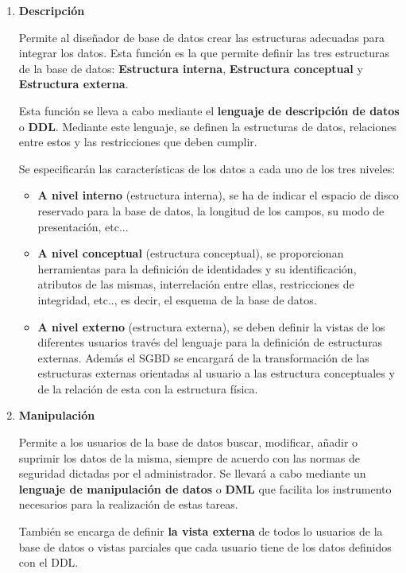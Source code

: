\begin{enumerate}
    \item \textbf{Descripción}

    Permite al diseñador de base de datos crear las estructuras adecuadas para integrar los datos. Esta función es la que permite definir las tres estructuras de la base de datos: \textbf{Estructura interna}, \textbf{Estructura conceptual} y \textbf{Estructura externa}.

    Esta función se lleva a cabo mediante el \textbf{lenguaje de descripción de datos} o \textbf{DDL}. Mediante este lenguaje, se definen la estructuras de datos, relaciones entre estos y las restricciones que deben cumplir.

    Se especificarán las características de los datos a cada uno de los tres niveles:

    \begin{itemize}
        \item \textbf{A nivel interno} (estructura interna), se ha de indicar el espacio de disco reservado para la base de datos, la longitud de los campos, su modo de presentación, etc...

        \item \textbf{A nivel conceptual} (estructura conceptual), se proporcionan herramientas para la definición de identidades y su identificación, atributos de las mismas, interrelación entre ellas, restricciones de integridad, etc.., es decir, el esquema de la base de datos.

        \item \textbf{A nivel externo} (estructura externa), se deben definir la vistas de los diferentes usuarios  través del lenguaje para la definición de estructuras externas. Además el SGBD se encargará de la transformación de las estructuras externas orientadas al usuario a las estructura conceptuales y de la relación de esta con la estructura física.
    \end{itemize}

    \item \textbf{Manipulación}

    Permite a los usuarios de la base de datos buscar, modificar, añadir o suprimir los datos de la misma, siempre de acuerdo con las normas de seguridad dictadas por el administrador. Se llevará a cabo mediante un \textbf{lenguaje de manipulación de datos} o \textbf{DML} que facilita los instrumento necesarios para la realización de estas tareas.

    También se encarga de definir \textbf{la vista externa} de todos lo usuarios de la base de datos o vistas parciales que cada usuario tiene de los datos definidos con el DDL.


\end{enumerate}
